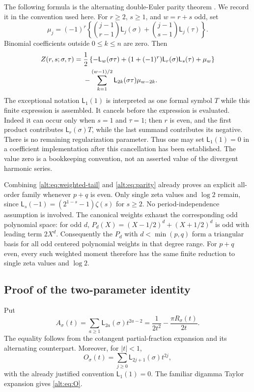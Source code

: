 \documentclass[11pt]{article}
\theoremstyle{definition}
\theoremstyle{remark}
\numberwithin{equation}{section}
\begin{document}
The following formula is the alternating double-Euler parity theorem
\cite{Teo,XuWang}. We record it in the convention used here.
For $r\ge2$, $s\ge1$, and $w=r+s$ odd, set
\[
 \mu_j=(-1)^r\left\{
 \binom{j-1}{r-1}\mathsf L_j(\sigma)
 +\binom{j-1}{s-1}\mathsf L_j(\tau)\right\}.
\]
Binomial coefficients outside $0\le k\le n$ are zero. Then
\begin{align}
 Z(r,s;\sigma,\tau)
 ={}&\frac12\left\{-\mathsf L_w(\sigma\tau)
 +(1+(-1)^r)\mathsf L_r(\sigma)\mathsf L_s(\tau)+\mu_w\right\}
 \notag\\
 &-\sum_{k=1}^{(w-1)/2}\mathsf L_{2k}(\sigma\tau)\mu_{w-2k}.
 \label{alt:eq:parity}
\end{align}
The exceptional notation $\mathsf L_1(1)$ is interpreted as one formal
symbol $T$ while this finite expression is assembled. It cancels before
the expression is evaluated. Indeed it can occur only when $s=1$ and
$\tau=1$; then $r$ is even, and the first product contributes
$\mathsf L_r(\sigma)T$, while the last summand contributes its negative.
There is no remaining regularization parameter. Thus one may set
$\mathsf L_1(1)=0$ in a coefficient implementation after this cancellation
has been established. The value zero is a bookkeeping convention, not
an asserted value of the divergent harmonic series.

Combining \eqref{alt:eq:weighted-tail} and \eqref{alt:eq:parity}
already proves an explicit all-order family whenever $p+q$ is even.
Only single zeta values and $\log2$ remain, since
$\mathsf L_s(-1)=(2^{1-s}-1)\zeta(s)$ for $s\ge2$.
No period-independence assumption is involved.
The canonical weights exhaust the corresponding odd polynomial space:
for odd $d$,
$P_d(X)=(X-1/2)^d+(X+1/2)^d$ is odd with leading term $2X^d$.
Consequently the $P_d$ with $d<\min(p,q)$ form a triangular basis
for all odd centered polynomial weights in that degree range.
For $p+q$ even, every such weighted moment therefore has the same
finite reduction to single zeta values and $\log2$.

\subsection{Proof of the two-parameter identity}

Put
\[
 A_\sigma(t)=\sum_{a\ge1}\mathsf L_{2a}(\sigma)t^{2a-2}
       =\frac1{2t^2}-\frac{\pi R_\sigma(t)}{2t}.
\]
The equality follows from the cotangent partial-fraction expansion and
its alternating counterpart. Moreover, for $|t|<1$,
\[
 O_\sigma(t)=\sum_{j\ge0}\mathsf L_{2j+1}(\sigma)t^{2j},
\]
with the already justified convention $\mathsf L_1(1)=0$.
The familiar digamma Taylor expansion gives \eqref{alt:eq:O}.
\end{document}
